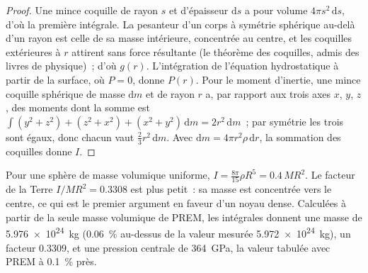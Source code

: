 \begin{proof}
Une mince coquille de rayon $s$ et d'épaisseur $\mathrm ds$ a pour volume
$4\pi s^2\,\mathrm ds$, d'où la première intégrale. La pesanteur d'un corps à
symétrie sphérique au-delà d'un rayon est celle de sa masse intérieure,
concentrée au centre, et les coquilles extérieures à $r$ attirent sans force
résultante (le théorème des coquilles, admis des livres de physique)~; d'où
$g(r)$. L'intégration de l'équation hydrostatique à partir de la surface, où
$P = 0$, donne $P(r)$. Pour le moment d'inertie, une mince coquille sphérique de
masse $\mathrm dm$ et de rayon $r$ a, par rapport aux trois axes $x$, $y$, $z$,
des moments dont la somme est
$\int (y^2 + z^2) + (z^2 + x^2) + (x^2 + y^2)\,\mathrm dm = 2r^2\,\mathrm dm$~;
par symétrie les trois sont égaux, donc chacun vaut $\tfrac23 r^2\,\mathrm dm$.
Avec $\mathrm dm = 4\pi r^2\rho\,\mathrm dr$, la sommation des coquilles donne $I$.
\end{proof}

Pour une sphère de masse volumique uniforme, $I = \tfrac{8\pi}{15}\rho R^5 = 0.4\,MR^2$.
Le facteur de la Terre $I/MR^2 = 0.3308$ est plus petit~: sa masse est concentrée
vers le centre, ce qui est le premier argument en faveur d'un noyau dense.
Calculées à partir de la seule masse volumique de PREM, les intégrales donnent une
masse de \qty{5.976e24}{kg} (\qty{0.06}{\percent} au-dessus de la valeur mesurée
\qty{5.972e24}{kg}), un facteur $0.3309$, et une pression centrale de
\qty{364}{GPa}, la valeur tabulée avec PREM à \qty{0.1}{\percent} près.


